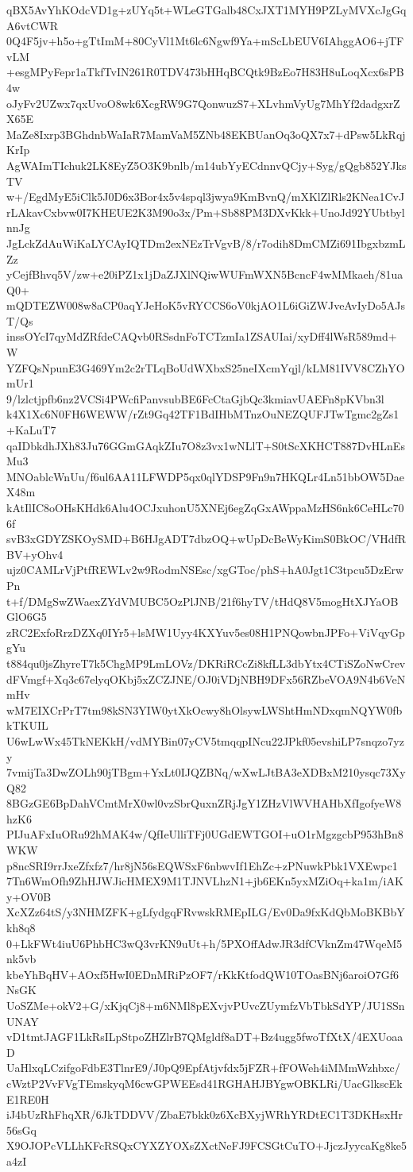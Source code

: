 qBX5AvYhKOdcVD1g+zUYq5t+WLeGTGalb48CxJXT1MYH9PZLyMVXcJgGqA6vtCWR
0Q4F5jv+h5o+gTtImM+80CyVl1Mt6lc6Ngwf9Ya+mScLbEUV6IAhggAO6+jTFvLM
+esgMPyFepr1aTkfTvIN261R0TDV473bHHqBCQtk9BzEo7H83H8uLoqXcx6sPB4w
oJyFv2UZwx7qxUvoO8wk6XcgRW9G7QonwuzS7+XLvhmVyUg7MhYf2dadgxrZX65E
MaZe8Ixrp3BGhdnbWaIaR7MamVaM5ZNb48EKBUanOq3oQX7x7+dPsw5LkRqjKrIp
AgWAImTIchuk2LK8EyZ5O3K9bnlb/m14ubYyECdnnvQCjy+Syg/gQgb852YJksTV
w+/EgdMyE5iClk5J0D6x3Bor4x5v4spql3jwya9KmBvnQ/mXKlZlRls2KNea1CvJ
rLAkavCxbvw0I7KHEUE2K3M90o3x/Pm+Sb88PM3DXvKkk+UnoJd92YUbtbylnnJg
JgLckZdAuWiKaLYCAyIQTDm2exNEzTrVgvB/8/r7odih8DmCMZi691IbgxbzmLZz
yCejfBhvq5V/zw+e20iPZ1x1jDaZJXlNQiwWUFmWXN5BcncF4wMMkaeh/81uaQ0+
mQDTEZW008w8aCP0aqYJeHoK5vRYCCS6oV0kjAO1L6iGiZWJveAvIyDo5AJsT/Qs
inssOYcI7qyMdZRfdeCAQvb0RSsdnFoTCTzmIa1ZSAUIai/xyDff4lWsR589md+W
YZFQsNpunE3G469Ym2c2rTLqBoUdWXbxS25neIXcmYqjl/kLM81IVV8CZhYOmUr1
9/lzlctjpfb6nz2VCSi4PWcfiPanvsubBE6FcCtaGjbQc3kmiavUAEFn8pKVbn3l
k4X1Xc6N0FH6WEWW/rZt9Gq42TF1BdIHbMTnzOuNEZQUFJTwTgmc2gZs1+KaLuT7
qaIDbkdhJXh83Ju76GGmGAqkZIu7O8z3vx1wNLlT+S0tScXKHCT887DvHLnEsMu3
MNOablcWnUu/f6ul6AA11LFWDP5qx0qlYDSP9Fn9n7HKQLr4Ln51bbOW5DaeX48m
kAtIlIC8oOHsKHdk6Alu4OCJxuhonU5XNEj6egZqGxAWppaMzHS6nk6CeHLc706f
svB3xGDYZSKOySMD+B6HJgADT7dbzOQ+wUpDcBeWyKimS0BkOC/VHdfRBV+yOhv4
ujz0CAMLrVjPtfREWLv2w9RodmNSEsc/xgGToc/phS+hA0Jgt1C3tpcu5DzErwPn
t+f/DMgSwZWaexZYdVMUBC5OzPlJNB/21f6hyTV/tHdQ8V5mogHtXJYaOBGlO6G5
zRC2ExfoRrzDZXq0IYr5+lsMW1Uyy4KXYuv5es08H1PNQowbnJPFo+ViVqyGpgYu
t884qu0jsZhyreT7k5ChgMP9LmLOVz/DKRiRCcZi8kfLL3dbYtx4CTiSZoNwCrev
dFVmgf+Xq3c67elyqOKbj5xZCZJNE/OJ0iVDjNBH9DFx56RZbeVOA9N4b6VeNmHv
wM7EIXCrPrT7tm98kSN3YIW0ytXkOcwy8hOlsywLWShtHmNDxqmNQYW0fbkTKUIL
U6wLwWx45TkNEKkH/vdMYBin07yCV5tmqqpINcu22JPkf05evshiLP7snqzo7yzy
7vmijTa3DwZOLh90jTBgm+YxLt0IJQZBNq/wXwLJtBA3eXDBxM210ysqc73XyQ82
8BGzGE6BpDahVCmtMrX0wl0vzSbrQuxnZRjJgY1ZHzVlWVHAHbXfIgofyeW8hzK6
PIJuAFxIuORu92hMAK4w/QfIeUlliTFj0UGdEWTGOI+uO1rMgzgcbP953hBn8WKW
p8ncSRI9rrJxeZfxfz7/hr8jN56sEQWSxF6nbwvIf1EhZc+zPNuwkPbk1VXEwpc1
7Tn6WmOfh9ZhHJWJicHMEX9M1TJNVLhzN1+jb6EKn5yxMZiOq+ka1m/iAKy+OV0B
XcXZz64tS/y3NHMZFK+gLfydgqFRvwskRMEpILG/Ev0Da9fxKdQbMoBKBbYkh8q8
0+LkFWt4iuU6PhbHC3wQ3vrKN9uUt+h/5PXOffAdwJR3dfCVknZm47WqeM5nk5vb
kbeYhBqHV+AOxf5HwI0EDnMRiPzOF7/rKkKtfodQW10TOasBNj6aroiO7Gf6NsGK
UoSZMe+okV2+G/xKjqCj8+m6NMl8pEXvjvPUvcZUymfzVbTbkSdYP/JU1SSnUNAY
vD1tmtJAGF1LkRsILpStpoZHZlrB7QMgldf8aDT+Bz4ugg5fwoTfXtX/4EXUoaaD
UaHlxqLCzifgoFdbE3TlnrE9/J0pQ9EpfAtjvfdx5jFZR+fFOWeh4iMMmWzhbxc/
cWztP2VvFVgTEmskyqM6cwGPWEEsd41RGHAHJBYgwOBKLRi/UacGlkscEkE1RE0H
iJ4bUzRhFhqXR/6JkTDDVV/ZbaE7bkk0z6XcBXyjWRhYRDtEC1T3DKHsxHr56sGq
X9OJOPcVLLhKFcRSQxCYXZYOXsZXctNeFJ9FCSGtCuTO+JjczJyycaKg8ke5a4zI
